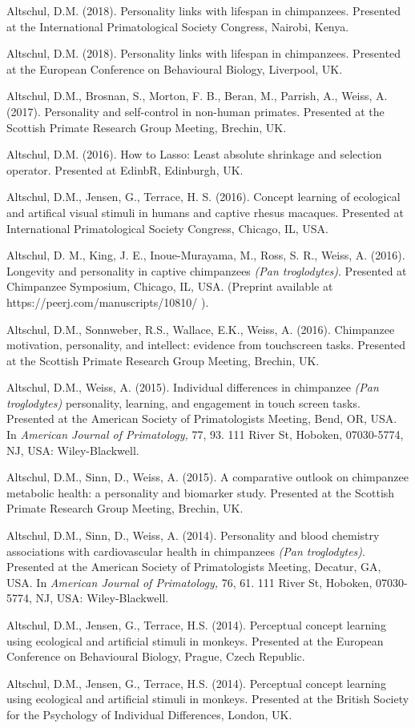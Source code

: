 \documentclass[margin,line]{res}
\begin{document}
\begin{resume}
Altschul, D.M. (2018). Personality links with lifespan in chimpanzees. Presented at the International Primatological Society Congress, Nairobi, Kenya.

Altschul, D.M. (2018). Personality links with lifespan in chimpanzees. Presented at the European Conference on Behavioural Biology, Liverpool, UK.

Altschul, D.M., Brosnan, S., Morton, F. B., Beran, M., Parrish, A., Weiss, A. (2017). Personality and self-control in non-human primates. Presented at the Scottish Primate Research Group Meeting, Brechin, UK.

Altschul, D.M. (2016). How to Lasso: Least absolute shrinkage and selection operator. Presented at EdinbR, Edinburgh, UK.

Altschul, D.M., Jensen, G.,  Terrace, H. S. (2016). Concept learning of ecological and artifical visual stimuli in humans and captive rhesus macaques. Presented at International Primatological Society Congress, Chicago, IL, USA.

Altschul, D. M., King, J. E., Inoue-Murayama, M., Ross, S. R., Weiss, A. (2016). Longevity and personality in captive chimpanzees {\it (Pan troglodytes)}. Presented at Chimpanzee Symposium, Chicago, IL, USA. (Preprint available at https://peerj.com/manuscripts/10810/ ).

Altschul, D.M., Sonnweber, R.S., Wallace, E.K., Weiss, A. (2016). Chimpanzee motivation, personality, and intellect: evidence from touchscreen tasks. Presented at the Scottish Primate Research Group Meeting, Brechin, UK.

Altschul, D.M., Weiss, A. (2015). Individual differences in chimpanzee {\it (Pan troglodytes)} personality, learning, and engagement in touch screen tasks. Presented at the American Society of Primatologists Meeting, Bend, OR, USA. In {\it American Journal of Primatology,} 77, 93. 111 River St, Hoboken, 07030-5774, NJ, USA: Wiley-Blackwell.

Altschul, D.M., Sinn, D., Weiss, A. (2015). A comparative outlook on chimpanzee metabolic health: a personality and biomarker study. Presented at the Scottish Primate Research Group Meeting, Brechin, UK.

Altschul, D.M., Sinn, D., Weiss, A. (2014).  Personality and blood chemistry associations with cardiovascular health in chimpanzees {\it (Pan troglodytes)}. Presented at the American Society of Primatologists Meeting, Decatur, GA, USA. In {\it American Journal of Primatology,} 76, 61. 111 River St, Hoboken, 07030-5774, NJ, USA: Wiley-Blackwell.

Altschul, D.M., Jensen, G., Terrace, H.S. (2014). Perceptual concept learning using ecological and artificial stimuli in monkeys. Presented at the European Conference on Behavioural Biology, Prague, Czech Republic.

Altschul, D.M., Jensen, G., Terrace, H.S. (2014). Perceptual concept learning using ecological and artificial stimuli in monkeys. Presented at the British Society for the Psychology of Individual Differences, London, UK.


\end{resume}
\end{document}
